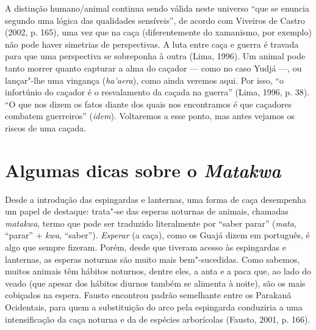 A distinção humano/animal continua sendo válida neste universo ``que se
enuncia segundo uma lógica das qualidades sensíveis'', de acordo com
Viveiros de Castro (2002, p. 165), uma vez que na caça (diferentemente
do xamanismo, por exemplo) não pode haver simetrias de perspectivas. A
luta entre caça e guerra é travada para que uma perspectiva se
sobreponha à outra (Lima, 1996). Um animal pode tanto morrer quanto
capturar a alma do caçador --- como no caso Yudjá ---, ou lançar"-lhe uma
vingança (\emph{ha'aera}), como ainda veremos aqui. Por isso, ``o
infortúnio do caçador é o resvalamento da caçada na guerra'' (Lima, 1996,
p. 38). ``O que nos dizem os fatos diante dos quais nos encontramos é que
caçadores combatem guerreiros'' (\emph{idem}). Voltaremos a esse ponto, mas
antes vejamos os riscos de uma caçada.

\section{Algumas dicas sobre o
\emph{Matakwa}}\label{algumas-dicas-sobre-o-matakwa}

Desde a introdução das espingardas e lanternas, uma forma de caça
desempenha um papel de destaque: trata"-se das esperas noturnas de
animais, chamadas \emph{matakwa}, termo que pode ser traduzido
literalmente por ``saber parar'' (\emph{mata}, ``parar'' + \emph{kwa},
``saber''). \emph{Esperar} (a caça), como os Guajá dizem em português, é
algo que sempre fizeram. Porém, desde que tiveram acesso às espingardas
e lanternas, as esperas noturnas são muito mais bem"-sucedidas. Como
sabemos, muitos animais têm hábitos noturnos, dentre eles, a anta e a
paca que, ao lado do veado (que apesar dos hábitos diurnos também se
alimenta à noite), são os mais cobiçados na espera. Fausto encontrou
padrão semelhante entre os Parakanã Ocidentais, para quem a substituição
do arco pela espingarda conduziria a uma intensificação da caça noturna
e da de espécies arborícolas (Fausto, 2001, p. 166).

